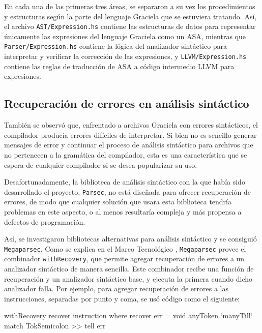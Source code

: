 En cada una de las primeras tres áreas, se separaron a su vez los procedimientos
y estructuras según la parte del lenguaje Graciela que se estuviera tratando.
Así, el archivo \texttt{AST/Expression.hs} contiene las estructuras de datos
para representar únicamente las expresiones del lenguaje Graciela como un
\textsc{ASA}, mientras que \texttt{Parser/Expression.hs} contiene la lógica del
analizador sintáctico para interpretar y verificar la corrección de las
expresiones, y \texttt{LLVM/Expression.hs} contiene las reglas de traducción de
\textsc{ASA} a código intermedio \textsc{LLVM} para expresiones.

\subsection{Recuperación de errores en análisis sintáctico}

También se observó que, enfrentado a archivos Graciela con errores sintácticos,
el compilador producía errores difíciles de interpretar. Si bien no es sencillo
generar mensajes de error y continuar el proceso de análisis sintáctico para
archivos que no pertenecen a la gramática del compilador, esta es una
característica que se espera de cualquier compilador si se desea popularizar su
uso.

Desafortunadamente, la biblioteca de análisis sintáctico con la que había sido
desarrollado el proyecto, \texttt{Parsec}, no está diseñada para ofrecer
recuperación de errores, de modo que cualquier solución que usara esta
biblioteca tendría problemas en este aspecto, o al menos resultaría compleja y
más propensa a defectos de programación.

Así, se investigaron bibliotecas alternativas para análisis sintáctico y se
consiguió \texttt{Megaparsec}. Como se explica en el Marco Tecnológico
, \texttt{Megaparsec} provee el
combinador \texttt{withRecovery}, que permite agregar recuperación de errores a
un analizador sintáctico de manera sencilla. Este combinador recibe una función
de recuperación y un analizador sintáctico base, y ejecuta la primera cuando
dicho analizador falla. Por ejemplo, para agregar recuperación de errores a las
instrucciones, separadas por punto y coma, se usó código como el siguiente:

\begin{haskellcode}
withRecovery recover instruction
  where
    recover err = void anyToken `manyTill` match TokSemicolon
               >> tell err
\end{haskellcode}

